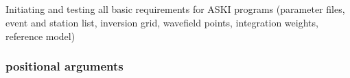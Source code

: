 %
%
\subsection{} \label{programs_scripts,sec:bin_prog,sec:in_basics}
Initiating and testing all basic requirements for ASKI programs (parameter files, event and station list, inversion grid, wavefield points, integration weights, reference model)

\subsubsection{positional arguments}
